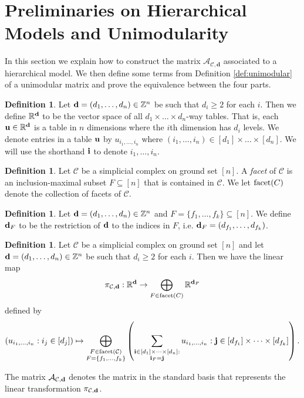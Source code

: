 \documentclass[letterpaper,12pt]{amsart}
\theoremstyle{plain}
\theoremstyle{definition}
\newtheorem{defn}[thm]{Definition}
\theoremstyle{remark}
\newcommand{\zz}{\mathbb{Z}}
\newcommand{\rr}{\mathbb{R}}
\newcommand{\bfd}{\mathbf{d}}
\newcommand{\calc}{\mathcal{C}}
\newcommand{\facet}{\textnormal{facet}}
\begin{document}

\section{Preliminaries on Hierarchical Models
and Unimodularity}\label{sec:preliminaries}

In this section we explain how to construct the matrix $\mathcal{A}_{\calc, \bfd}$ associated to a hierarchical model.
We then define some terms from Definition \ref{def:unimodular} of a unimodular matrix  and prove the equivalence between the four parts.


\begin{defn}
	Let ${\bf d} = (d_1,\dots,d_n) \in \zz^n$ be such that $d_i \ge 2$ for each $i$.
	Then we define $\rr^{\bf d}$ to be the vector space of all $d_1\times \dots \times d_n$-way tables.
	That is, each ${\bf u} \in \rr^{\bf d}$ is a table in $n$ dimensions where the $i$th dimension has $d_i$ levels.
	We denote entries in a table ${\bf u}$ by $u_{i_1,\dots,i_n}$ where $(i_1,\dots,i_n) \in [d_1]\times\dots\times [d_n]$.
	We will use the shorthand ${\bf i}$ to denote ${i_1,\dots,i_n}$.
\end{defn}

\begin{defn}
	Let $\mathcal{C}$ be a simplicial complex on ground set $[n]$.
	A \emph{facet} of $\mathcal{C}$ is an inclusion-maximal subset $F \subseteq [n]$
	that is contained in $\mathcal{C}$.
	We let $\facet(C)$ denote the collection of facets of $\mathcal{C}$.
\end{defn}

\begin{defn}
	Let ${\bf d} = (d_1,\dots,d_n) \in \zz^n$ and $F = \{f_1,\dots,f_k\} \subseteq [n]$.
	We define ${\bf d}_F$ to be the restriction of ${\bf d}$ to the indices in $F$,
	i.e. ${\bf d}_F = (d_{f_1},\dots,d_{f_k})$.
\end{defn}

\begin{defn}
	Let $\mathcal{C}$ be a simplicial complex on ground set $[n]$
	and let ${\bf d} = (d_1,\dots,d_n) \in \zz^n$ be such that $d_i \ge 2$ for each $i$.
	Then we have the linear map
	\[
		\pi_{\calc,{\bf d}}: \rr^{\bf d} \rightarrow \bigoplus_{F \in \facet(C)} \rr^{{\bf d}_F}
	\]
	defined by
	\[
		(u_{i_1, \ldots, i_n}  :  i_j \in [d_j])  \mapsto  \bigoplus_{\substack{{F \in {\rm facet}(\calc)}\\F=\{f_1,\dots,f_k\}}}
		\left( \sum_{\substack{{\bf i} \in [d_1]\times\dots\times[d_n]:
				\\{\bf i}_F = {\bf j}}}  u_{i_1, \ldots, i_n} : {\bf j} \in [d_{f_1}]\times\dots\times[d_{f_k}]  \right).
	\]

	The matrix $\mathcal{A}_{\calc,{\bf d}}$ denotes the matrix in the standard basis
	that represents the linear transformation $\pi_{\mathcal{C},{\bf d}}$.
\end{defn}
\end{document}

